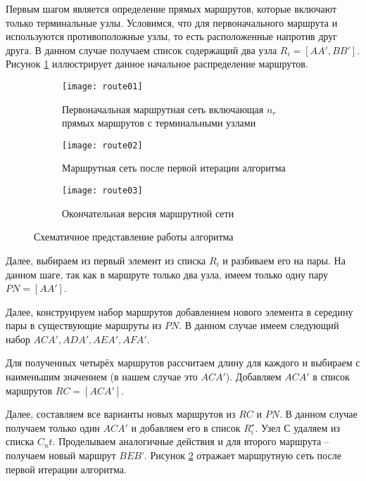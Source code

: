 Первым шагом является определение прямых маршрутов, которые включают только терминальные узлы. Условимся, 
что для первоначального маршрута и используются противоположные узлы, то есть расположенные напротив друг 
друга. В данном случае получаем список содержащий два узла \( R_i = [AA', BB'] \). Рисунок 
\ref{fig:route_first} иллюстрирует данное начальное распределение маршрутов.

\begin{figure}[ht!]
    \centering
    \begin{subfigure}{0.3\textwidth}
        \centering
        \texttt{[image: route01]}
        \caption{Первоначальная маршрутная сеть включающая \( n_r \) прямых маршрутов с терминальными узлами}
        \label{fig:route_first}
    \end{subfigure}
    \begin{subfigure}{0.3\textwidth}
        \centering
        \texttt{[image: route02]}
        \caption{Маршрутная сеть после первой итерации алгоритма}
        \label{fig:route_second}
    \end{subfigure}
    \begin{subfigure}{0.3\textwidth}
        \centering
        \texttt{[image: route03]}
        \caption{Окончательная версия маршрутной сети}
        \label{fig:route_third}
    \end{subfigure}
    \caption{Схематичное представление работы алгоритма}
    \label{fig:route}
\end{figure}

Далее, выбираем из первый элемент из списка \( R_i \) и разбиваем его на пары. На данном шаге, так как в 
маршруте только два узла, имеем только одну пару \( PN = [AA'] \).

Далее, конструируем набор маршрутов добавлением нового элемента в середину пары в существующие маршруты из 
\( PN \). В данном случае имеем следующий набор \( ACA', ADA', AEA', AFA' \).

Для полученных четырёх маршрутов рассчитаем длину для каждого и выбираем с наименьшим значением 
(в нашем случае это \( ACA' \)). Добавляем \( ACA' \) в список маршрутов \( RC = [ACA'] \).

Далее, составляем все варианты новых маршрутов из \( RC \) и \( PN \). В данном случае получаем только один 
\( ACA' \) и добавляем его в список \( R^{\star}_{i} \). Узел \( С \) удаляем из списка \( C_nt \).
Проделываем аналогичные действия и для второго маршрута -- получаем новый маршрут \( BEB’ \).
Рисунок \ref{fig:route_second} отражает маршрутную сеть после первой итерации алгоритма.

